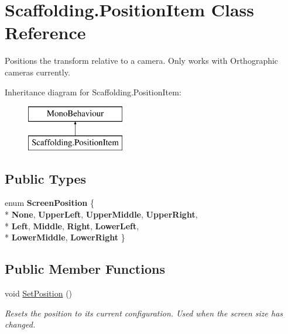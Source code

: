 \hypertarget{class_scaffolding_1_1_position_item}{\section{Scaffolding.\+Position\+Item Class Reference}
\label{class_scaffolding_1_1_position_item}
}


Positions the transform relative to a camera. Only works with Orthographic cameras currently.  


Inheritance diagram for Scaffolding.\+Position\+Item\+:\begin{figure}[H]
\begin{center}
\leavevmode
\includegraphics[height=2.000000cm]{class_scaffolding_1_1_position_item}
\end{center}
\end{figure}
\subsection*{Public Types}
\begin{DoxyCompactItemize}
\item 
\hypertarget{class_scaffolding_1_1_position_item_a4045eacf961abf4a013e76d3ac247e0b}{enum {\bfseries Screen\+Position} \{ \\*
{\bfseries None}, 
{\bfseries Upper\+Left}, 
{\bfseries Upper\+Middle}, 
{\bfseries Upper\+Right}, 
\\*
{\bfseries Left}, 
{\bfseries Middle}, 
{\bfseries Right}, 
{\bfseries Lower\+Left}, 
\\*
{\bfseries Lower\+Middle}, 
{\bfseries Lower\+Right}
 \}}\label{class_scaffolding_1_1_position_item_a4045eacf961abf4a013e76d3ac247e0b}

\end{DoxyCompactItemize}
\subsection*{Public Member Functions}
\begin{DoxyCompactItemize}
\item 
void \hyperlink{class_scaffolding_1_1_position_item_acf8866c7ad64b0d81429c5dfa95482fd}{Set\+Position} ()
\begin{DoxyCompactList}\small\item\em Resets the position to its current configuration. Used when the screen size has changed. \end{DoxyCompactList}\end{DoxyCompactItemize}
